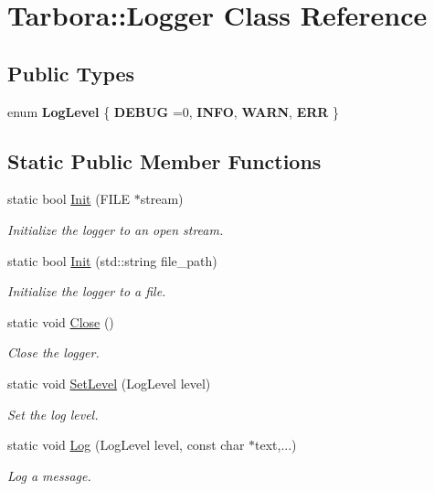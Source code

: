 \hypertarget{classTarbora_1_1Logger}{}\section{Tarbora\+:\+:Logger Class Reference}
\label{classTarbora_1_1Logger}
\subsection*{Public Types}
\begin{DoxyCompactItemize}
\item 
\mbox{\label{classTarbora_1_1Logger_a0596faea258f2da51ad7ca3abd806be3}} 
enum {\bfseries Log\+Level} \{ {\bfseries D\+E\+B\+UG} =0, 
{\bfseries I\+N\+FO}, 
{\bfseries W\+A\+RN}, 
{\bfseries E\+RR}
 \}
\end{DoxyCompactItemize}
\subsection*{Static Public Member Functions}
\begin{DoxyCompactItemize}
\item 
static bool \hyperlink{classTarbora_1_1Logger_abb526de5b2ecd2bda6ec4883de07bec8}{Init} (F\+I\+LE $\ast$stream)
\begin{DoxyCompactList}\small\item\em Initialize the logger to an open stream. \end{DoxyCompactList}\item 
static bool \hyperlink{classTarbora_1_1Logger_a625b88289ed91c3059320a9573e16103}{Init} (std\+::string file\+\_\+path)
\begin{DoxyCompactList}\small\item\em Initialize the logger to a file. \end{DoxyCompactList}\item 
\mbox{\label{classTarbora_1_1Logger_add4c310a2ab7b0daa730e477853d6c8f}} 
static void \hyperlink{classTarbora_1_1Logger_add4c310a2ab7b0daa730e477853d6c8f}{Close} ()
\begin{DoxyCompactList}\small\item\em Close the logger. \end{DoxyCompactList}\item 
static void \hyperlink{classTarbora_1_1Logger_af2a11244236bad59fce9cc6a1360af29}{Set\+Level} (Log\+Level level)
\begin{DoxyCompactList}\small\item\em Set the log level. \end{DoxyCompactList}\item 
static void \hyperlink{classTarbora_1_1Logger_aa32641fca455178d88f3b1c8b2f552ab}{Log} (Log\+Level level, const char $\ast$text,...)
\begin{DoxyCompactList}\small\item\em Log a message. \end{DoxyCompactList}\end{DoxyCompactItemize}


